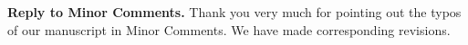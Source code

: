 \documentclass[11pt]{article}
\begin{document}
\noindent \textbf{Reply to Minor Comments.}
Thank you very much for pointing out the typos of our manuscript in Minor Comments. We have made corresponding revisions.


%
%

%
%
%
~\\[4mm]

\newpage
\end{document}
